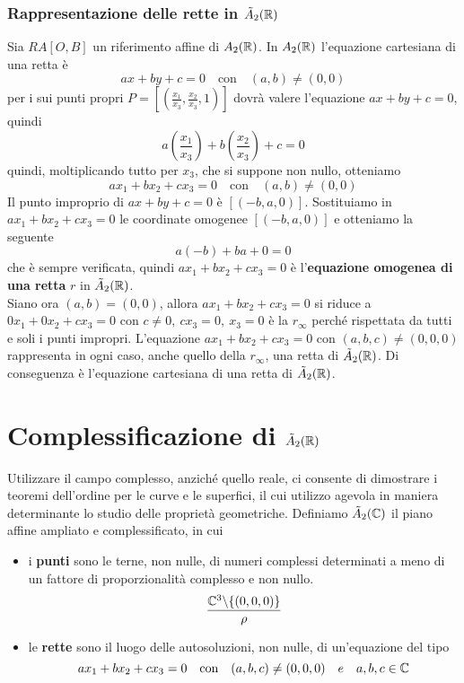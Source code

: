 \documentclass[twoside]{report}
\begin{document}
\subsubsection{Rappresentazione delle rette in \(\tilde{A}_{2}(\RR) \)}
Sia \(RA [O, B]\) un riferimento affine di \(A_{2}(\RR) \). In \(A_{2}(\RR) \) l'equazione cartesiana di una retta è 
\[ax+by+c = 0 \quad \text{con} \quad  (a,b) \neq (0,0)\]
per i sui punti propri \(P = \left[ \left( \frac{x_1}{x_3}, \frac{x_2}{x_3}, 1 \right)  \right] \) dovrà valere l'equazione \(ax+by+c = 0\), quindi \[
a \left( \frac{x_1}{x_3} \right) + b \left( \frac{x_2}{x_3} \right) + c = 0 \]
quindi, moltiplicando tutto per \(x_3\), che si suppone non nullo, otteniamo
\[ ax_1+ bx_2+ cx_3=0 \quad \text{con}\quad (a,b) \neq (0,0)
\] Il punto improprio di \(ax+by+c=0\) è \([(-b, a, 0)]\). Sostituiamo in \(ax_1+ bx_2+ cx_3=0\) le coordinate omogenee \([(-b, a, 0)]\) e otteniamo la seguente \[
a(-b) + b a + 0 = 0
\] che è sempre verificata, quindi \(ax_1+ bx_2+ cx_3=0\) è l'\textbf{equazione omogenea di una retta} \(r\) in \(\tilde{A}_{2}(\RR) \). \\
Siano ora \((a,b) = (0,0)\), allora \(ax_1+ bx_2+ cx_3=0\) si riduce a \(0 x_1+0x_2+cx_3=0\) con \(c \neq 0, \ cx_3 = 0, \ x_3 = 0\) è la \(r_{\infty}\) perché rispettata da tutti e soli i punti impropri. 
L'equazione \(ax_1+bx_2+cx_3= 0\) con \((a,b,c) \neq (0,0,0)\) rappresenta in ogni caso, anche quello della \(r_\infty\), una retta di \(\tilde{A}_{2}(\RR) \). Di conseguenza è l'equazione cartesiana di una retta di \(\tilde{A}_{2}(\RR)\).

\section{Complessificazione di \(\tilde{A}_{2}(\RR) \)}

Utilizzare il campo complesso, anziché quello reale, ci consente di dimostrare i teoremi dell'ordine per le curve e le superfici, il cui utilizzo agevola in maniera determinante lo studio delle proprietà geometriche. Definiamo \(\tilde{A}_{2}(\CC) \) il piano affine ampliato e complessificato, in cui
\begin{itemize}
    \item i \textbf{punti} sono le terne, non nulle, di numeri complessi determinati a meno di un fattore di proporzionalità complesso e non nullo.
\[
\frac{\CC^{3}\backslash \{(0,0,0)\} }{\rho }
\] 
    \item le \textbf{rette} sono il luogo delle autosoluzioni, non nulle, di un'equazione del tipo \[
    ax_1+bx_2+cx_3= 0 \quad \text{con} \quad (a,b,c) \neq (0,0,0) \quad e \quad a,b,c \in \CC
    \] 
\end{itemize}
\end{document}
